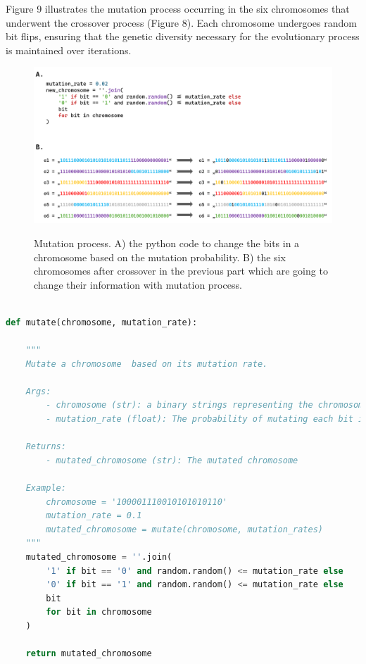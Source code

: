 \documentclass[12pt]{article}
\begin{document}
Figure 9 illustrates the mutation process occurring in the six chromosomes that underwent the crossover process (Figure 8). Each chromosome undergoes random bit flips, ensuring that the genetic diversity necessary for the evolutionary process is maintained over iterations.


\begin{figure}[H]
\centering
\includegraphics[scale=0.60]{Picture8}\\
\caption{Mutation process. A) the python code to change the bits in a chromosome based on the mutation probability. B) the six chromosomes after crossover in the previous part which are going to change their information with mutation process.}
\end{figure}


\newpage


\begin{lstlisting}[language=Python, caption={Mutate a chromosome  based on its mutation rate}, numbers=none, breaklines=true]

def mutate(chromosome, mutation_rate):

    """
    Mutate a chromosome  based on its mutation rate.

    Args:
        - chromosome (str): a binary strings representing the chromosome,
        - mutation_rate (float): The probability of mutating each bit in chromosome.

    Returns:
        - mutated_chromosome (str): The mutated chromosome

    Example:
        chromosome = '100001110010101010110'
        mutation_rate = 0.1
        mutated_chromosome = mutate(chromosome, mutation_rates)
    """
    mutated_chromosome = ''.join(
        '1' if bit == '0' and random.random() <= mutation_rate else
        '0' if bit == '1' and random.random() <= mutation_rate else
        bit
        for bit in chromosome
    )

    return mutated_chromosome
    
\end{lstlisting}
\end{document}
